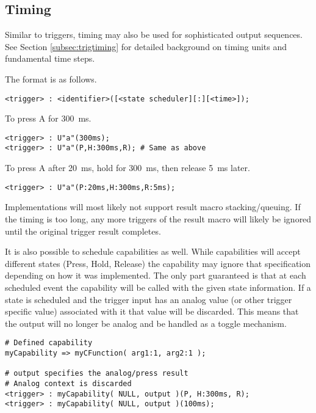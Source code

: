 \documentclass{kiibohd-template}
\begin{document}
\subsection{Timing}
\label{subsec:resulttiming}

Similar to triggers, timing may also be used for sophisticated output sequences.
See Section \ref{subsec:trigtiming} for detailed background on timing units and fundamental time steps.

The format is as follows.
\begin{lstlisting}
<trigger> : <identifier>([<state scheduler][:][<time>]);
\end{lstlisting}

To press A for 300~ms.

\begin{lstlisting}
<trigger> : U"a"(300ms);
<trigger> : U"a"(P,H:300ms,R); # Same as above
\end{lstlisting}

To press A after 20~ms, hold for 300~ms, then release 5~ms later.

\begin{lstlisting}
<trigger> : U"a"(P:20ms,H:300ms,R:5ms);
\end{lstlisting}

Implementations will most likely not support result macro stacking/queuing.
If the timing is too long, any more triggers of the result macro will likely be ignored until the original trigger result completes.

It is also possible to schedule capabilities as well.
While capabilities will accept different states (Press, Hold, Release) the capability may ignore that specification depending on how it was implemented.
The only part guaranteed is that at each scheduled event the capability will be called with the given state information.
If a state is scheduled and the trigger input has an analog value (or other trigger specific value) associated with it that value will be discarded.
This means that the output will no longer be analog and be handled as a toggle mechanism.

\begin{lstlisting}
# Defined capability
myCapability => myCFunction( arg1:1, arg2:1 );

# output specifies the analog/press result
# Analog context is discarded
<trigger> : myCapability( NULL, output )(P, H:300ms, R);
<trigger> : myCapability( NULL, output )(100ms);
\end{lstlisting}
\end{document}
